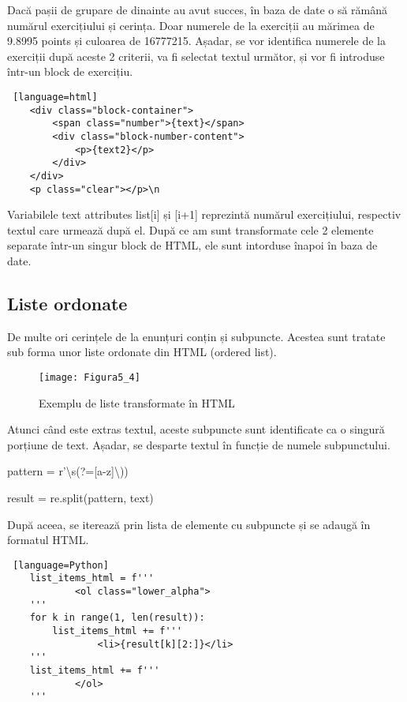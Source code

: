 Dacă pașii de grupare de dinainte au avut succes, în baza de date o să rămână numărul exercițiului și cerința. Doar numerele de la exerciții au mărimea de 9.8995 points și culoarea de 16777215. Așadar, se vor identifica numerele de la exerciții după aceste 2 criterii, va fi selectat textul următor, și vor fi introduse într-un block de exercițiu.
\vspace{1em}
\begin{lstlisting} [language=html]
	<div class="block-container">
		<span class="number">{text}</span>
		<div class="block-number-content">
			<p>{text2}</p>
		</div>
	</div>
	<p class="clear"></p>\n
\end{lstlisting}
\vspace{1em}

Variabilele text attributes list[i] și [i+1] reprezintă numărul exercițiului, respectiv textul care urmează după el. După ce am sunt transformate cele 2 elemente separate într-un singur block de HTML, ele sunt intorduse înapoi în baza de date.


\subsection{Liste ordonate}

De multe ori cerințele de la enunțuri conțin și subpuncte. Acestea sunt tratate sub forma unor liste ordonate din HTML (ordered list).
\begin{figure}[H]
	\centering
	\texttt{[image: Figura5\_4]}
	\caption{Exemplu de liste transformate în HTML}
	\label{fig:Figura5_4}
\end{figure}

Atunci când este extras textul, aceste subpuncte sunt identificate ca o singură porțiune de text. Așadar, se desparte textul în funcție de numele subpunctului. 
\begin{center}
	pattern = r'\textbackslash s(?=[a-z]\textbackslash))
	
	result = re.split(pattern, text)
\end{center}

După aceea, se iterează prin lista de elemente cu subpuncte și se adaugă în formatul HTML.
\vspace{1em}
\begin{lstlisting} [language=Python]
	list_items_html = f'''
			<ol class="lower_alpha">
	'''
	for k in range(1, len(result)):
		list_items_html += f'''
				<li>{result[k][2:]}</li>
	'''
	list_items_html += f'''
			</ol>
	'''
\end{lstlisting}
\vspace{1em}

